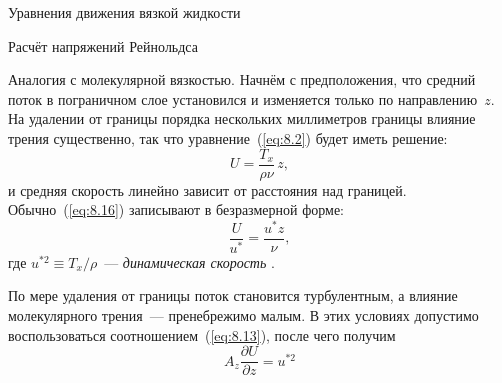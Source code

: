 \begin{chapter}{Уравнения движения вязкой жидкости}
\begin{section}{Расчёт напряжений Рейнольдса}
\begin{paragraph}{Аналогия с молекулярной вязкостью.}
Начнём с предположения, что средний поток в пограничном слое установился 
и изменяется только по направлению~$z$. На удалении от границы порядка
нескольких миллиметров границы влияние трения существенно, так что 
уравнение~(\ref{eq:8.2}) будет иметь решение:
\begin{equation}\label{eq:8.16}
U = \frac{T_x}{\rho \nu} \,z,
\end{equation}
и средняя скорость линейно зависит от расстояния над границей. 
Обычно~(\ref{eq:8.16}) записывают в безразмерной форме:
\begin{equation}
\frac{U}{u^*} = \frac{u^* z}{\nu},
\end{equation}
где $u^{*2} \equiv T_x/\rho$~--- \emph{динамическая скорость}%
. 
%

По мере удаления от границы поток становится турбулентным, а влияние
молекулярного трения~--- пренебрежимо малым. В этих условиях допустимо
воспользоваться соотношением~(\ref{eq:8.13}), после чего получим
\begin{equation}
 A_z \frac{\partial U}{\partial z} = u^{*2}
\end{equation}
%


\end{paragraph}
\end{section}
\end{chapter}
